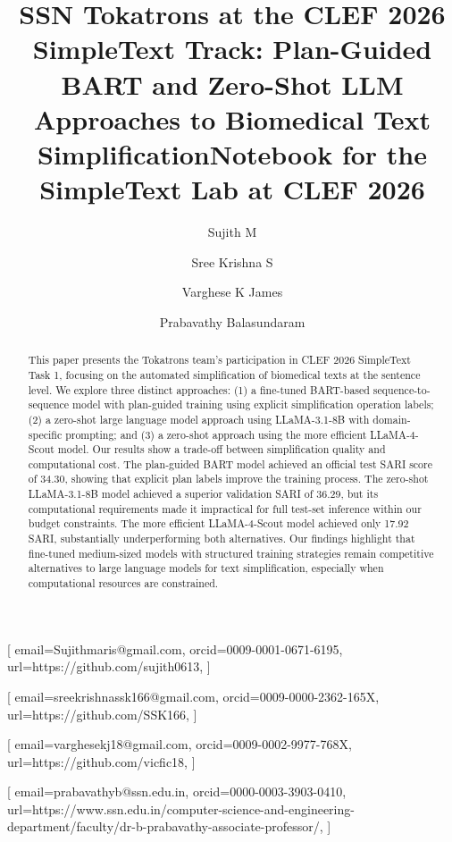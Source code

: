 \documentclass{ceurart}
\newcommand{\cpaper}{SSN Tokatrons at the CLEF 2026 SimpleText Track: Plan-Guided BART and Zero-Shot LLM Approaches to Biomedical Text Simplification}
\begin{document}


\title{\cpaper}
\title[mode=sub]{Notebook for the SimpleText Lab at CLEF 2026}

\tnotemark[1]

\author[1]{Sujith M}[%
email=Sujithmaris@gmail.com,
orcid=0009-0001-0671-6195,
url=https://github.com/sujith0613,
]

\author[1]{Sree Krishna S}[%
email=sreekrishnassk166@gmail.com,
orcid=0009-0000-2362-165X,
url=https://github.com/SSK166,
]

\author[1]{Varghese K James}[%
email=varghesekj18@gmail.com,
orcid=0009-0002-9977-768X,
url=https://github.com/vicfic18,
]

\author[1]{Prabavathy Balasundaram}[%
email=prabavathyb@ssn.edu.in,
orcid=0000-0003-3903-0410,
url=https://www.ssn.edu.in/computer-science-and-engineering-department/faculty/dr-b-prabavathy-associate-professor/,
]

\address[1]{Sri Sivasubramaniya Nadar College of Engineering, Chennai, India}


\begin{abstract}
This paper presents the Tokatrons team's participation in CLEF 2026 SimpleText Task 1, focusing on the automated simplification of biomedical texts at the sentence level.
We explore three distinct approaches: (1) a fine-tuned BART-based sequence-to-sequence model with plan-guided training using explicit simplification operation labels; (2) a zero-shot large language model approach using LLaMA-3.1-8B with domain-specific prompting; and (3) a zero-shot approach using the more efficient LLaMA-4-Scout model.
Our results show a trade-off between simplification quality and computational cost.
The plan-guided BART model achieved an official test SARI score of 34.30, showing that explicit plan labels improve the training process.
The zero-shot LLaMA-3.1-8B model achieved a superior validation SARI of 36.29, but its computational requirements made it impractical for full test-set inference within our budget constraints.
The more efficient LLaMA-4-Scout model achieved only 17.92 SARI, substantially underperforming both alternatives.
Our findings highlight that fine-tuned medium-sized models with structured training strategies remain competitive alternatives to large language models for text simplification, especially when computational resources are constrained.
\end{abstract}
\end{document}
